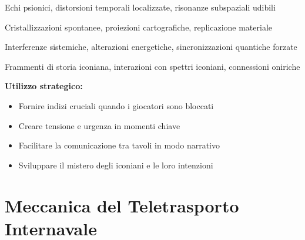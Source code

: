 \documentclass[11pt,a4paper]{article}
\begin{document}
\begin{tcolorbox}[colback=iconianblue!20, colframe=iconianblue, title=\textbf{Manifestazioni Iconiane}]
\begin{description}[leftmargin=*]
\item[Sensoriali] Echi psionici, distorsioni temporali localizzate, risonanze subspaziali udibili

\item[Fisiche] Cristallizzazioni spontanee, proiezioni cartografiche, replicazione materiale

\item[Tecnologiche] Interferenze sistemiche, alterazioni energetiche, sincronizzazioni quantiche forzate

\item[Narrative] Frammenti di storia iconiana, interazioni con spettri iconiani, connessioni oniriche
\end{description}

\textbf{Utilizzo strategico:}
\begin{itemize}[leftmargin=*]
\item Fornire indizi cruciali quando i giocatori sono bloccati
\item Creare tensione e urgenza in momenti chiave
\item Facilitare la comunicazione tra tavoli in modo narrativo
\item Sviluppare il mistero degli iconiani e le loro intenzioni
\end{itemize}
\end{tcolorbox}

\section{Meccanica del Teletrasporto Internavale}
\end{document}
